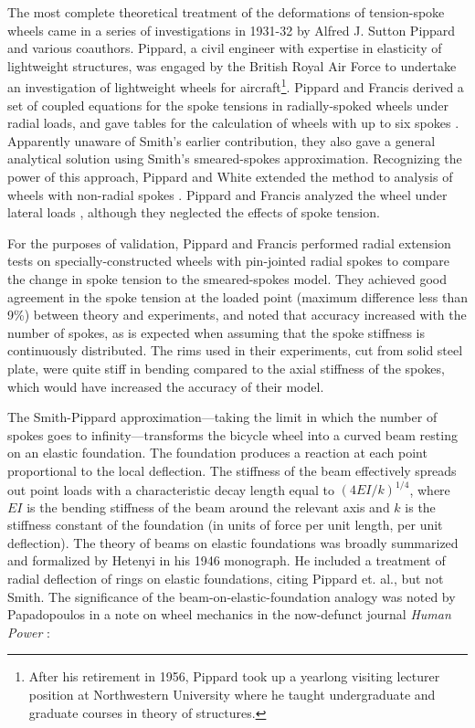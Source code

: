 \documentclass[../thesis.tex]{subfiles}
\begin{document}
The most complete theoretical treatment of the deformations of tension-spoke wheels came in a series of investigations in 1931-32 by Alfred J. Sutton Pippard and various coauthors. Pippard, a civil engineer with expertise in elasticity of lightweight structures, was engaged by the British Royal Air Force to undertake an investigation of lightweight wheels for aircraft\footnote{After his retirement in 1956, Pippard took up a yearlong visiting lecturer position at Northwestern University where he taught undergraduate and graduate courses in theory of structures.}. Pippard and Francis derived a set of coupled equations for the spoke tensions in radially-spoked wheels under radial loads, and gave tables for the calculation of wheels with up to six spokes \cite{Pippard1931}. Apparently unaware of Smith's earlier contribution, they also gave a general analytical solution using Smith's smeared-spokes approximation. Recognizing the power of this approach, Pippard and White extended the method to analysis of wheels with non-radial spokes \cite{Pippard1932b}. Pippard and Francis analyzed the wheel under lateral loads \cite{Pippard1932a}, although they neglected the effects of spoke tension.

For the purposes of validation, Pippard and Francis performed radial extension tests on specially-constructed wheels with pin-jointed radial spokes to compare the change in spoke tension to the smeared-spokes model. They achieved good agreement in the spoke tension at the loaded point (maximum difference less than 9\%) between theory and experiments, and noted that accuracy increased with the number of spokes, as is expected when assuming that the spoke stiffness is continuously distributed. The rims used in their experiments, cut from solid steel plate, were quite stiff in bending compared to the axial stiffness of the spokes, which would have increased the accuracy of their model.

The Smith-Pippard approximation---taking the limit in which the number of spokes goes to infinity---transforms the bicycle wheel into a curved beam resting on an elastic foundation. The foundation produces a reaction at each point proportional to the local deflection. The stiffness of the beam effectively spreads out point loads with a characteristic decay length equal to $(4EI/k)^{1/4}$, where $EI$ is the bending stiffness of the beam around the relevant axis and $k$ is the stiffness constant of the foundation (in units of force per unit length, per unit deflection). The theory of beams on elastic foundations was broadly summarized and formalized by Hetenyi \cite{Hetenyi1946} in his 1946 monograph. He included a treatment of radial deflection of rings on elastic foundations, citing Pippard et. al., but not Smith. The significance of the beam-on-elastic-foundation analogy was noted by Papadopoulos in a note on wheel mechanics in the now-defunct journal \emph{Human Power} \cite{Papadopoulos1986}:
\end{document}
